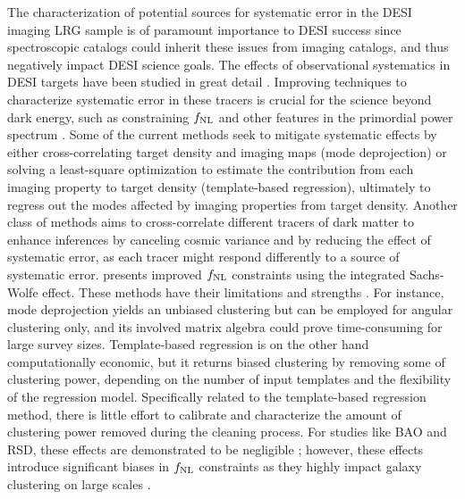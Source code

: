 The characterization of potential sources for systematic error in the DESI imaging LRG sample is of paramount importance to DESI success since spectroscopic catalogs could inherit these issues from imaging catalogs, and thus negatively impact DESI science goals. The effects of observational systematics in DESI targets have been studied in great detail \cite[see, e.g.,][]{kitanidis2020imaging, zhou2021clustering, chaussidon2022angular}. Improving techniques to characterize systematic error in these tracers is crucial for the science beyond dark energy, such as constraining $f_{\rm NL}$ and other features in the primordial power spectrum \citep{beutler2019primordial}. Some of the current methods seek to mitigate systematic effects by either cross-correlating target density and imaging maps (mode deprojection) or solving a least-square optimization to estimate the contribution from each imaging property to target density (template-based regression), ultimately to regress out the modes affected by imaging properties from target density. Another class of methods aims to cross-correlate different tracers of dark matter to enhance inferences by canceling cosmic variance and by reducing the effect of systematic error, as each tracer might respond differently to a source of systematic error. \cite{giannantonio2014improved} presents improved $f_{\rm NL}$ constraints using the integrated Sachs-Wolfe effect. These methods have their limitations and strengths \citep[see, e.g.,][for a review]{2021MNRAS.503.5061W}. For instance, mode deprojection yields an unbiased clustering but can be employed for angular clustering only, and its involved matrix algebra could prove time-consuming for large survey sizes. Template-based regression is on the other hand computationally economic, but it returns biased clustering by removing some of clustering power, depending on the number of input templates and the flexibility of the regression model. Specifically related to the template-based regression method, there is little effort to calibrate and characterize the amount of clustering power removed during the cleaning process. For studies like BAO and RSD, these effects are demonstrated to be negligible \citep{merz2021clustering}; however, these effects introduce significant biases in $f_{\rm NL}$ constraints \citep{mueller2022primordial} as they highly impact galaxy clustering on large scales \citep{rezaie2021primordial}.  
 

